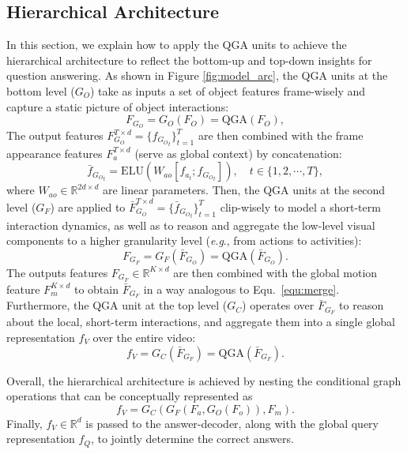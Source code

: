 \documentclass[letterpaper]{article} \usepackage{aaai21}  \usepackage{times}  \usepackage{helvet} \usepackage{courier}  \usepackage[hyphens]{url}  \usepackage{graphicx} \urlstyle{rm} \def\UrlFont{\rm}  \usepackage{natbib}  \usepackage{caption} \usepackage{color, colortbl}
\newcommand{\eg}{\textit{e}.\textit{g}.}
\begin{document}
\subsection{Hierarchical Architecture}
In this section, we explain how to apply the QGA units to achieve the hierarchical architecture to reflect the bottom-up and top-down insights for question answering. As shown in Figure \ref{fig:model_arc}, the QGA units at the bottom level ($G_O$) take as inputs a set of object features frame-wisely and capture a static picture of object interactions:
\begin{equation}
F_{G_O} = G_O(F_O) = \text{QGA}(F_O), 
\end{equation}
The output features $F_{G_O}^{T\times d}=\{f_{{G_O}_t}\}_{t=1}^T$ are then combined with the frame appearance features $F_a^{T \times d}$ (serve as global context) by concatenation:
\begin{equation}
\label{equ:merge}
\bar{f}_{{G_O}_t} = \text{ELU}(W_{ao}[f_{a_t}; f_{{G_O}_t}]), \quad t\in \{1, 2, \cdots, T\},
\end{equation}
where $W_{ao} \in \mathbb{R}^{2d \times d}$ are linear parameters. Then, the QGA units at the second level ($G_F$) are applied to $\bar{F}_{G_{O}}^{T\times d}=\{\bar{f}_{{G_O}_t}\}_{t=1}^T$ clip-wisely to model a short-term interaction dynamics, as well as to reason and aggregate the low-level visual components to a higher granularity level (\eg, from actions to activities):
\begin{equation}
F_{G_F} = G_F(\bar{F}_{G_O}) = \text{QGA}(\bar{F}_{G_O}).   
\end{equation}
\noindent The outputs features $F_{G_F} \in \mathbb{R}^{K\times d}$ are then combined with the global motion feature $F_m^{K \times d}$ to obtain $\bar{F}_{G_F}$ in a way analogous to Equ.~\ref{equ:merge}. Furthermore, the QGA unit at the top level ($G_C$) operates over $\bar{F}_{G_F}$ to reason about the local, short-term interactions, and aggregate them into a single global representation $f_V$ over the entire video:
\begin{equation}
f_V = G_C(\bar{F}_{G_F}) = \text{QGA}(\bar{F}_{G_F}).   
\end{equation}

Overall, the hierarchical architecture is achieved by nesting the conditional graph operations that can be conceptually represented as
\begin{equation}
    f_V=G_C(G_F(F_a, G_O(F_o)), F_m).
\end{equation}
\noindent Finally, $f_V \in \mathbb{R}^d$ is passed to the answer-decoder, along with the global query representation $f_Q$, to jointly determine the correct answers.
\end{document}
